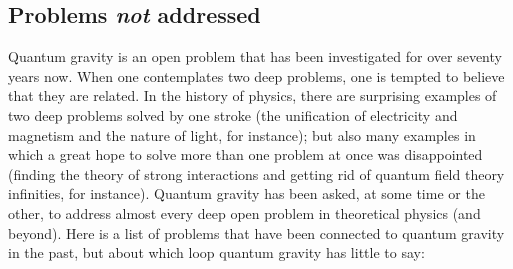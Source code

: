 \documentclass[12pt]{article}
\begin{document}
\subsection{Problems {\em not\/} addressed}

Quantum gravity is an open problem that has been investigated for 
over seventy years now.  When one contemplates two deep problems, 
one is tempted to believe that they are related.  In the history 
of physics, there are surprising examples of two deep problems 
solved by one stroke (the unification of electricity and 
magnetism and the nature of light, for instance); but also many 
examples in which a great hope to solve more than one problem at 
once was disappointed (finding the theory of strong interactions 
and getting rid of quantum field theory infinities, for 
instance).  Quantum gravity has been asked, at some time or the 
other, to address almost every deep open problem in theoretical 
physics (and beyond).  Here is a list of problems that have been 
connected to quantum gravity in the past, but about which loop 
quantum gravity has little to say:
\end{document}
